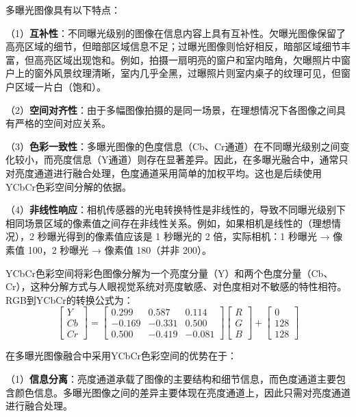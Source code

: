 多曝光图像具有以下特点：

（1）\textbf{互补性}：不同曝光级别的图像在信息内容上具有互补性。欠曝光图像保留了高亮区域的细节，但暗部区域信息不足；过曝光图像则恰好相反，暗部区域细节丰富，但高亮区域出现饱和。例如，拍摄一扇明亮的窗户和室内暗角，欠曝照片中窗户上的窗外风景纹理清晰，室内几乎全黑，过曝照片则室内桌子的纹理可见，但窗户区域一片白（饱和）。

（2）\textbf{空间对齐性}：由于多幅图像拍摄的是同一场景，在理想情况下各图像之间具有严格的空间对应关系。

（3）\textbf{色彩一致性}：多曝光图像的色度信息（Cb、Cr通道）在不同曝光级别之间变化较小，而亮度信息（Y通道）则存在显著差异。因此，在多曝光融合中，通常只对亮度通道进行融合处理，色度通道采用简单的加权平均。这也是后续使用YCbCr色彩空间分解的依据。

（4）\textbf{非线性响应}：相机传感器的光电转换特性是非线性的，导致不同曝光级别下相同场景区域的像素值之间存在非线性关系。例如，如果相机是线性的（理想情况），2 秒曝光得到的像素值应该是 1 秒曝光的 2 倍，实际相机：1 秒曝光 → 像素值 100，2 秒曝光 → 像素值 180（并非 200）。

YCbCr色彩空间将彩色图像分解为一个亮度分量（Y）和两个色度分量（Cb、Cr），这种分解方式与人眼视觉系统对亮度敏感、对色度相对不敏感的特性相符。RGB到YCbCr的转换公式为：
\begin{equation}
    \begin{bmatrix} Y \\ Cb \\ Cr \end{bmatrix} = \begin{bmatrix} 0.299 & 0.587 & 0.114 \\ -0.169 & -0.331 & 0.500 \\ 0.500 & -0.419 & -0.081 \end{bmatrix} \begin{bmatrix} R \\ G \\ B \end{bmatrix} + \begin{bmatrix} 0 \\ 128 \\ 128 \end{bmatrix}
\end{equation}

在多曝光图像融合中采用YCbCr色彩空间的优势在于：

（1）\textbf{信息分离}：亮度通道承载了图像的主要结构和细节信息，而色度通道主要包含颜色信息。多曝光图像之间的差异主要体现在亮度通道上，因此只需对亮度通道进行融合处理。


